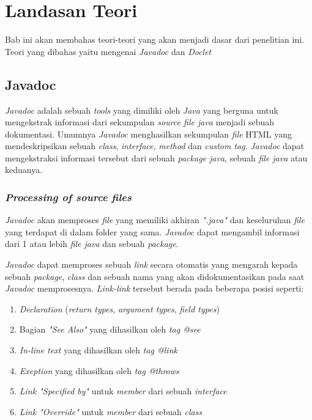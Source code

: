 \chapter{Landasan Teori}
\label{chap:teori}
Bab ini akan membahas teori-teori yang akan menjadi dasar dari penelitian ini. Teori yang dibahas yaitu mengenai {\it Javadoc} dan {\it Doclet}

\section{Javadoc}
\label{sec:javadoc} 
{\it Javadoc} adalah sebuah {\it tools} yang dimiliki oleh {\it Java} yang berguna untuk mengekstrak informasi dari sekumpulan {\it source file java} menjadi sebuah dokumentasi. Umumnya {\it Javadoc} menghasilkan sekumpulan {\it file} HTML yang mendeskripsikan sebuah {\it class}, {\it interface}, {\it method} dan {\it custom tag}. {\it Javadoc} dapat mengekstraksi informasi tersebut dari sebuah {\it package java}, sebuah {\it file java} atau keduanya. \cite{javadoc:01:javadoc}

\subsection{\textit{Processing of source files}}
\label{sec:javadoc}
{\it Javadoc} akan memproses {\it file} yang memiliki akhiran {\it ".java"} dan keseluruhan {\it file} yang terdapat di dalam folder yang sama. {\it Javadoc} dapat mengambil informasi dari 1 atau lebih {\it file java} dan sebuah {\it package}.

{\it Javadoc} dapat memproses sebuah {\it link} secara otomatis yang mengarah kepada sebuah {\it package}, {\it class} dan sebuah nama yang akan didokumentasikan pada saat {\it Javadoc} memprosesnya. {\it Link-link} tersebut berada pada beberapa posisi seperti:
\begin{enumerate}
	\item {\it Declaration} ({\it return types}, {\it argument types}, {\it field types})
	\item Bagian {\it "See Also"} yang dihasilkan oleh {\it tag @see}
	\item {\it In-line text} yang dihasilkan oleh {\it tag {@link}}
	\item {\it Exeption} yang dihasilkan oleh {\it tag @throws}
	\item {\it Link "Specified by"} untuk {\it member} dari sebuah {\it interface}
	\item {\it Link "Override"} untuk {\it member} dari sebuah {\it class}
\end{enumerate}


